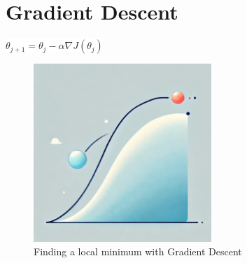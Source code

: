 \documentclass[
  12 pt,
  a4paper,
]{book}
\numberwithin{equation}{section}
\theoremstyle{plain}      %
\theoremstyle{definition} %
\theoremstyle{remark}     %
\theoremstyle{note}         %
\begin{document}
\mainmatter

\renewcommand{\chaptername}{Equation}

\hypertarget{gradient-descent}{%
\chapter{Gradient Descent}\label{gradient-descent}}

\begin{center}
\colorbox{white}{\color{navyimpactblue} \huge $\theta_{j+1} = \theta_j - \alpha \nabla J(\theta_j)$}
\end{center}

\hfill\break

\begin{figure}[h!]
  \begin{center}
    \includegraphics[width=0.6\textwidth]{pictures/Whimsical-1-gradient_descent.jpeg}
    \caption*{\Large Finding a local minimum with Gradient Descent}
  \end{center}
\end{figure}

\newpage

\vspace*{\fill}
\end{document}
